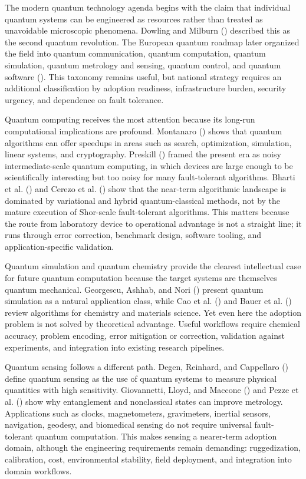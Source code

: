 \documentclass[
  11pt,
  letterpaper,
]{article}
\begin{document}
The modern quantum technology agenda begins with the claim that
individual quantum systems can be engineered as resources rather than
treated as unavoidable microscopic phenomena. Dowling and Milburn
() described this as the second quantum
revolution. The European quantum roadmap later organized the field into
quantum communication, quantum computation, quantum simulation, quantum
metrology and sensing, quantum control, and quantum software
(). This taxonomy remains
useful, but national strategy requires an additional classification by
adoption readiness, infrastructure burden, security urgency, and
dependence on fault tolerance.

Quantum computing receives the most attention because its long-run
computational implications are profound. Montanaro
() shows that quantum algorithms can
offer speedups in areas such as search, optimization, simulation, linear
systems, and cryptography. Preskill ()
framed the present era as noisy intermediate-scale quantum computing, in
which devices are large enough to be scientifically interesting but too
noisy for many fault-tolerant algorithms. Bharti et al.
() and Cerezo et al.
() show that the near-term algorithmic
landscape is dominated by variational and hybrid quantum-classical
methods, not by the mature execution of Shor-scale fault-tolerant
algorithms. This matters because the route from laboratory device to
operational advantage is not a straight line; it runs through error
correction, benchmark design, software tooling, and application-specific
validation.

Quantum simulation and quantum chemistry provide the clearest
intellectual case for future quantum computation because the target
systems are themselves quantum mechanical. Georgescu, Ashhab, and Nori
() present quantum simulation as a
natural application class, while Cao et al.
() and Bauer et al.
() review algorithms for chemistry and
materials science. Yet even here the adoption problem is not solved by
theoretical advantage. Useful workflows require chemical accuracy,
problem encoding, error mitigation or correction, validation against
experiments, and integration into existing research pipelines.

Quantum sensing follows a different path. Degen, Reinhard, and
Cappellaro () define quantum sensing as
the use of quantum systems to measure physical quantities with high
sensitivity. Giovannetti, Lloyd, and Maccone
() and Pezze et al.
() show why entanglement and nonclassical
states can improve metrology. Applications such as clocks,
magnetometers, gravimeters, inertial sensors, navigation, geodesy, and
biomedical sensing do not require universal fault-tolerant quantum
computation. This makes sensing a nearer-term adoption domain, although
the engineering requirements remain demanding: ruggedization,
calibration, cost, environmental stability, field deployment, and
integration into domain workflows.
\end{document}
